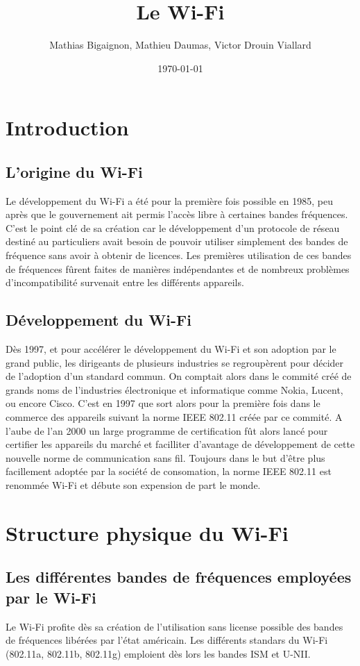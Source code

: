 \documentclass[12pt]{article}
\title{Le Wi-Fi}
\author{Mathias Bigaignon, Mathieu Daumas, Victor Drouin Viallard}
\date{\today}
\begin{document}
 
\maketitle
\newpage
\tableofcontents
\newpage
\section{Introduction}

\subsection{L'origine du Wi-Fi}
Le développement du Wi-Fi a été pour la première fois possible en 1985, peu après que le gouvernement ait permis l'accès libre à certaines bandes fréquences. C'est le point clé de sa création car le développement d'un protocole de réseau destiné au particuliers avait besoin de pouvoir utiliser simplement des bandes de fréquence sans avoir à obtenir de licences. Les premières utilisation de ces bandes de fréquences fûrent faites de manières indépendantes et de nombreux problèmes d'incompatibilité survenait entre les différents appareils.

\subsection{Développement du Wi-Fi}
Dès 1997, et pour accélérer le développement du Wi-Fi et son adoption par le grand public, les dirigeants de plusieurs industries se regroupèrent pour décider de l'adoption d'un standard commun. On comptait alors dans le commité créé de grands noms de l'industries électronique et informatique comme Nokia, Lucent, ou encore Cisco. C'est en 1997 que sort alors pour la première fois dans le commerce des appareils suivant la norme IEEE 802.11 créée par ce commité. A l'aube de l'an 2000 un large programme de certification fût alors lancé pour certifier les appareils du marché et facilliter d'avantage de développement de cette nouvelle norme de communication sans fil. Toujours dans le but d'être plus facillement adoptée par la société de consomation, la norme IEEE 802.11 est renommée Wi-Fi et débute son expension de part le monde.

\newpage
\section{Structure physique du Wi-Fi}

\subsection{Les différentes bandes de fréquences employées par le Wi-Fi}
Le Wi-Fi profite dès sa création de l'utilisation sans license possible des bandes de fréquences libérées par l'état américain. Les différents standars du Wi-Fi (802.11a, 802.11b, 802.11g) emploient dès lors les bandes ISM et U-NII.
\end{document}
